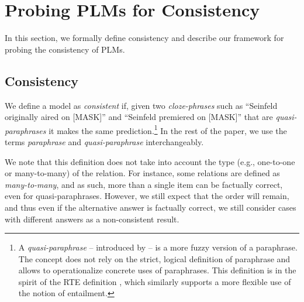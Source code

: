 \section{Probing PLMs for Consistency}
\label{sec:probe}

In this section, we formally define consistency and describe
our framework for probing the consistency of PLMs.

\subsection{Consistency}
We define a model as \emph{consistent} if, given  two
\textit{cloze-phrases} such as 
 ``Seinfeld originally aired on [MASK]'' and
``Seinfeld premiered on [MASK]'' that
are \textit{quasi-paraphrases} it makes the same
prediction.\footnote{A \textit{quasi-paraphrase} --
  introduced by \citet{what_is_paraphrase} -- is a more
  fuzzy version of a paraphrase. The concept does not rely
  on the strict, logical definition of paraphrase and
  allows to operationalize concrete uses of
  paraphrases. This definition is in the spirit of the RTE
  definition \cite{dagan-rte}, which similarly supports a
  more flexible use of the notion of entailment.}
In the rest of the paper, we use the terms \textit{paraphrase} and \textit{quasi-paraphrase} interchangeably.

 
We note that this definition does not take into account the type (e.g., one-to-one or many-to-many) of the relation. %
For instance, some relations are defined as \textit{many-to-many}, and as such, more than a single item can be factually correct, even for quasi-paraphrases. However, we still expect that the order will remain, and thus even if the alternative answer is factually correct, we still consider cases with different answers as a non-consistent result.

